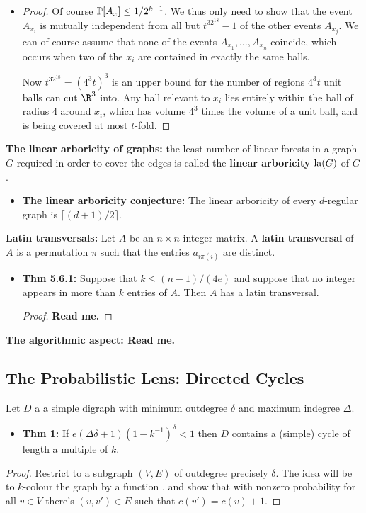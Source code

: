 \documentclass[11pt]{article}
\newenvironment{INT}[1][]{\begin{itemize}\small\item\textbf{#1}}{\end{itemize}}
\begin{document}
\begin{chapter5}
\begin{itemise}
\begin{INT}
\begin{proof}
\INDENT Of course $\operatorname{\mathbb{P}}[A_x]\leq1/2^{k-1}$. We thus only need to show that the event $A_{x_i}$ is mutually independent from all but $t^32^{18}-1$ of the other events $A_{x_j}$. We can of course assume that none of the events $A_{x_1},\ldots,A_{x_n}$ coincide, which occurs when two of the $x_i$ are contained in exactly the same balls.

\INDENT Now $t^32^{18}=(4^3t)^3$ is an upper bound for the number of regions $4^3t$ unit balls can cut $\R^3$ into. Any ball relevant to $x_i$ lies entirely within the ball of radius 4 around $x_i$, which has volume $4^3$ times the volume of a unit ball, and is being covered at most $t$-fold.
\end{proof}
\end{INT}
\item \textbf{The linear arboricity of graphs:} the least number of linear forests in a graph $G$ required in order to cover the edges is called the \textbf{linear arboricity} $\textup{la}(G)$ of $G$.
\begin{INT}[The linear arboricity conjecture:]
The linear arboricity of every $d$-regular graph is $\lceil (d+1)/2\rceil$.
\end{INT}
\item \textbf{Latin transversals:} Let $A$ be an $n\times n$ integer matrix. A \textbf{latin transversal} of $A$ is a permutation $\pi$ such that the entries $a_{i\pi(i)}$ are distinct.
\begin{INT}[Thm 5.6.1:]
Suppose that $k\leq(n-1)/(4e)$ and suppose that no integer appears in more than $k$ entries of $A$. Then $A$ has a latin transversal.
\begin{proof}
\textbf{Read me.}
\end{proof}
\end{INT}
\item \textbf{The algorithmic aspect: Read me.}
\end{itemise}
\subsection*{The Probabilistic Lens: Directed Cycles}
Let $D$ a a simple digraph with minimum outdegree $\delta$ and maximum indegree $\Delta$.
\begin{INT}[Thm 1:]
If $e(\Delta\delta+1)(1-k^{-1})^\delta<1$ then $D$ contains a (simple) cycle of length a multiple of $k$.
\end{INT}
\begin{proof}
Restrict to a subgraph $(V,E)$ of outdegree precisely $\delta$. The idea will be to $k$-colour the graph by a function , and show that with nonzero probability for all $v\in V$ there's $(v,v')\in E$ such that $c(v')=c(v)+1$.


\end{proof}
\end{chapter5}
\end{document}
